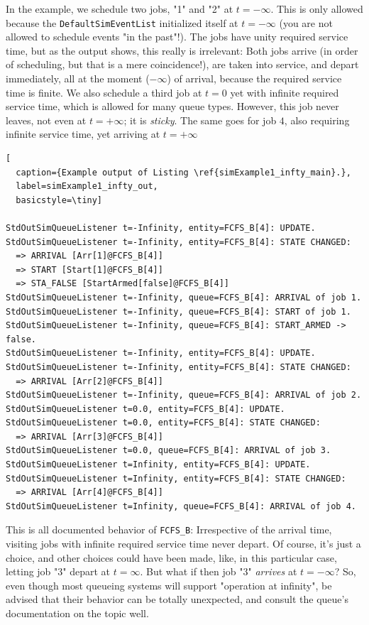 \documentclass[12pt]{book}
\begin{document}
In the example, we schedule two jobs, "1" and "2" at $t=-\infty$.
This is only allowed because the \lstinline|DefaultSimEventList|
  initialized itself at $t=-\infty$
  (you are not allowed to schedule events "in the past"!).
The jobs have unity required service time,
  but as the output shows, this really is irrelevant:
  Both jobs arrive (in order of scheduling, but that is a mere coincidence!),
    are taken into service, and depart immediately,
    all at the moment ($-\infty$) of arrival,
    because the required service time is finite.
We also schedule a third job at $t=0$ yet with infinite
  required service time,
  which is allowed for many queue types.
However, this job never leaves, not even at $t=+\infty$;
  it is {\em sticky\/}.
The same goes for job $4$,
  also requiring infinite service time,
  yet arriving at $t=+\infty$

\begin{lstfloat}
\begin{lstlisting}[
  caption={Example output of Listing \ref{simExample1_infty_main}.},
  label=simExample1_infty_out,
  basicstyle=\tiny]

StdOutSimQueueListener t=-Infinity, entity=FCFS_B[4]: UPDATE.
StdOutSimQueueListener t=-Infinity, entity=FCFS_B[4]: STATE CHANGED:
  => ARRIVAL [Arr[1]@FCFS_B[4]]
  => START [Start[1]@FCFS_B[4]]
  => STA_FALSE [StartArmed[false]@FCFS_B[4]]
StdOutSimQueueListener t=-Infinity, queue=FCFS_B[4]: ARRIVAL of job 1.
StdOutSimQueueListener t=-Infinity, queue=FCFS_B[4]: START of job 1.
StdOutSimQueueListener t=-Infinity, queue=FCFS_B[4]: START_ARMED -> false.
StdOutSimQueueListener t=-Infinity, entity=FCFS_B[4]: UPDATE.
StdOutSimQueueListener t=-Infinity, entity=FCFS_B[4]: STATE CHANGED:
  => ARRIVAL [Arr[2]@FCFS_B[4]]
StdOutSimQueueListener t=-Infinity, queue=FCFS_B[4]: ARRIVAL of job 2.
StdOutSimQueueListener t=0.0, entity=FCFS_B[4]: UPDATE.
StdOutSimQueueListener t=0.0, entity=FCFS_B[4]: STATE CHANGED:
  => ARRIVAL [Arr[3]@FCFS_B[4]]
StdOutSimQueueListener t=0.0, queue=FCFS_B[4]: ARRIVAL of job 3.
StdOutSimQueueListener t=Infinity, entity=FCFS_B[4]: UPDATE.
StdOutSimQueueListener t=Infinity, entity=FCFS_B[4]: STATE CHANGED:
  => ARRIVAL [Arr[4]@FCFS_B[4]]
StdOutSimQueueListener t=Infinity, queue=FCFS_B[4]: ARRIVAL of job 4.

\end{lstlisting}
\end{lstfloat}

This is all documented behavior of \lstinline|FCFS_B|:
  Irrespective of the arrival time,
  visiting jobs with infinite required service time
  never depart.
Of course, it's just a choice, and other choices could have been made,
  like, in this particular case,
  letting job "3" depart at $t=\infty$.
But what if then job "3" {\em arrives\/} at $t=-\infty$?
So, even though most queueing systems
  will support "operation at infinity",
  be advised that their behavior
  can be totally unexpected,
  and consult the queue's documentation on the topic well.
\end{document}
